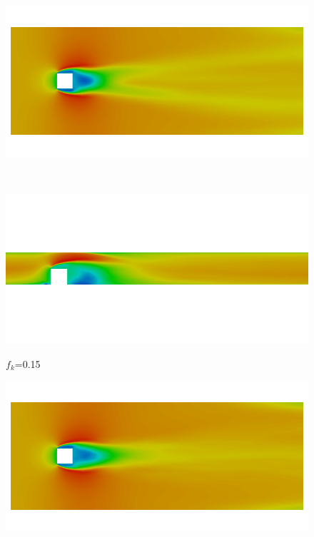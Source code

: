 \begin{figure}[H]
\begin{minipage}[b]{0.5\linewidth}
\end{minipage}
\begin{minipage}[b]{0.5\linewidth}
\includegraphics[scale=0.25]{figure/fine/three/Umean_y.png}
\caption*{}
\end{minipage}\\
\begin{minipage}[b]{0.5\linewidth}
\includegraphics[scale=0.25]{figure/fine/one/Umean_z.png}
\caption*{$f_k$=0.15}
\end{minipage}
\begin{minipage}[b]{0.5\linewidth}
\includegraphics[scale=0.25]{figure/fine/one/Umean_y.png}
\caption*{}
\end{minipage}

\end{figure}
